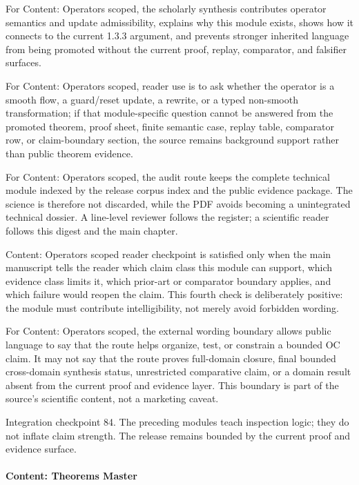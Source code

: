 For Content: Operators scoped, the scholarly synthesis contributes operator semantics and update admissibility, explains why this module exists, shows how it connects to the current 1.3.3 argument, and prevents stronger inherited language from being promoted without the current proof, replay, comparator, and falsifier surfaces.


For Content: Operators scoped, reader use is to ask whether the operator is a smooth flow, a guard/reset update, a rewrite, or a typed non-smooth transformation; if that module-specific question cannot be answered from the promoted theorem, proof sheet, finite semantic case, replay table, comparator row, or claim-boundary section, the source remains background support rather than public theorem evidence.


For Content: Operators scoped, the audit route keeps the complete technical module indexed by the release corpus index and the public evidence package. The science is therefore not discarded, while the PDF avoids becoming a unintegrated technical dossier. A line-level reviewer follows the register; a scientific reader follows this digest and the main chapter.


Content: Operators scoped reader checkpoint is satisfied only when the main manuscript tells the reader which claim class this module can support, which evidence class limits it, which prior-art or comparator boundary applies, and which failure would reopen the claim. This fourth check is deliberately positive: the module must contribute intelligibility, not merely avoid forbidden wording.


For Content: Operators scoped, the external wording boundary allows public language to say that the route helps organize, test, or constrain a bounded OC claim. It may not say that the route proves full-domain closure, final bounded cross-domain synthesis status, unrestricted comparative claim, or a domain result absent from the current proof and evidence layer. This boundary is part of the source's scientific content, not a marketing caveat.


Integration checkpoint 84. The preceding modules teach inspection logic; they do not inflate claim strength. The release remains bounded by the current proof and evidence surface.


\paragraph{Content: Theorems Master}

